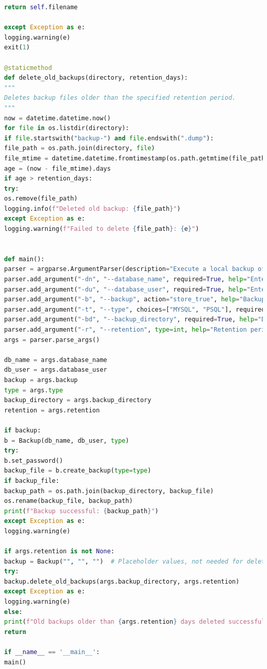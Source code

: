 \begin{lstlisting}[language=Python, caption=Python-script voor back-ups en retentie]
return self.filename

except Exception as e:
logging.warning(e)
exit(1)

@staticmethod
def delete_old_backups(directory, retention_days):
"""
Deletes backup files older than the specified retention period.
"""
now = datetime.datetime.now()
for file in os.listdir(directory):
if file.startswith("backup-") and file.endswith(".dump"):
file_path = os.path.join(directory, file)
file_mtime = datetime.datetime.fromtimestamp(os.path.getmtime(file_path))
age = (now - file_mtime).days
if age > retention_days:
try:
os.remove(file_path)
logging.info(f"Deleted old backup: {file_path}")
except Exception as e:
logging.warning(f"Failed to delete {file_path}: {e}")


def main():
parser = argparse.ArgumentParser(description="Execute a local backup of a database.")
parser.add_argument("-dn", "--database_name", required=True, help="Enter the name of the database for the backup.")
parser.add_argument("-du", "--database_user", required=True, help="Enter the username of the database for the backup.")
parser.add_argument("-b", "--backup", action="store_true", help="Backup the database.")
parser.add_argument("-t", "--type", choices=["MYSQL", "PSQL"], required=True, help="MYSQL or PSQL")
parser.add_argument("-bd", "--backup_directory", required=True, help="Directory where backups will be stored.")
parser.add_argument("-r", "--retention", type=int, help="Retention period in days for old backups.")
args = parser.parse_args()

db_name = args.database_name
db_user = args.database_user
backup = args.backup
type = args.type
backup_directory = args.backup_directory
retention = args.retention

if backup:
b = Backup(db_name, db_user, type)
try:
b.set_password()
backup_file = b.create_backup(type=type)
if backup_file:
backup_path = os.path.join(backup_directory, backup_file)
os.rename(backup_file, backup_path)
print(f"Backup successful: {backup_path}")
except Exception as e:
logging.warning(e)

if args.retention is not None:
backup = Backup("", "", "")  # Placeholder values, not needed for deletion
try:
backup.delete_old_backups(args.backup_directory, args.retention)
except Exception as e:
logging.warning(e)
else:
print(f"Old backups older than {args.retention} days deleted successfully.")
return

if __name__ == '__main__':
main()

\end{lstlisting}

